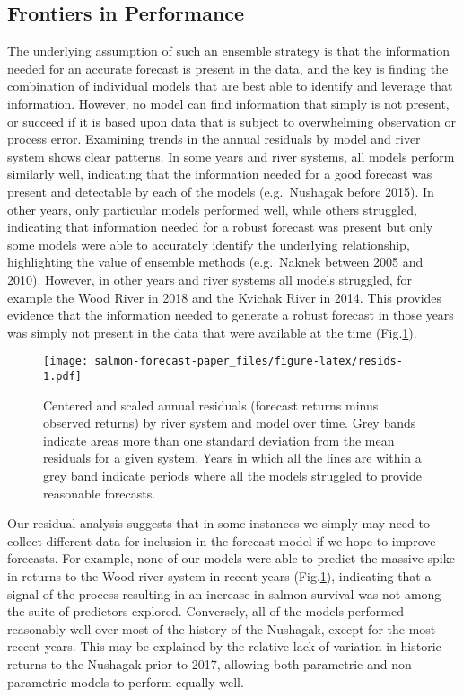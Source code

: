 \documentclass[
]{article}
\begin{document}
\hypertarget{frontiers-in-performance}{%
\subsection{Frontiers in Performance}\label{frontiers-in-performance}}

The underlying assumption of such an ensemble strategy is that the information needed for an accurate forecast is present in the data, and the key is finding the combination of individual models that are best able to identify and leverage that information. However, no model can find information that simply is not present, or succeed if it is based upon data that is subject to overwhelming observation or process error. Examining trends in the annual residuals by model and river system shows clear patterns. In some years and river systems, all models perform similarly well, indicating that the information needed for a good forecast was present and detectable by each of the models (e.g.~Nushagak before 2015). In other years, only particular models performed well, while others struggled, indicating that information needed for a robust forecast was present but only some models were able to accurately identify the underlying relationship, highlighting the value of ensemble methods (e.g.~Naknek between 2005 and 2010). However, in other years and river systems all models struggled, for example the Wood River in 2018 and the Kvichak River in 2014. This provides evidence that the information needed to generate a robust forecast in those years was simply not present in the data that were available at the time (Fig.\ref{fig:resids}).

\begin{figure}
\centering
\texttt{[image: salmon-forecast-paper\_files/figure-latex/resids-1.pdf]}
\caption{\label{fig:resids}Centered and scaled annual residuals (forecast returns minus observed returns) by river system and model over time. Grey bands indicate areas more than one standard deviation from the mean residuals for a given system. Years in which all the lines are within a grey band indicate periods where all the models struggled to provide reasonable forecasts.}
\end{figure}

Our residual analysis suggests that in some instances we simply may need to collect different data for inclusion in the forecast model if we hope to improve forecasts. For example, none of our models were able to predict the massive spike in returns to the Wood river system in recent years (Fig.\ref{fig:resids}), indicating that a signal of the process resulting in an increase in salmon survival was not among the suite of predictors explored. Conversely, all of the models performed reasonably well over most of the history of the Nushagak, except for the most recent years. This may be explained by the relative lack of variation in historic returns to the Nushagak prior to 2017, allowing both parametric and non-parametric models to perform equally well.
\end{document}
